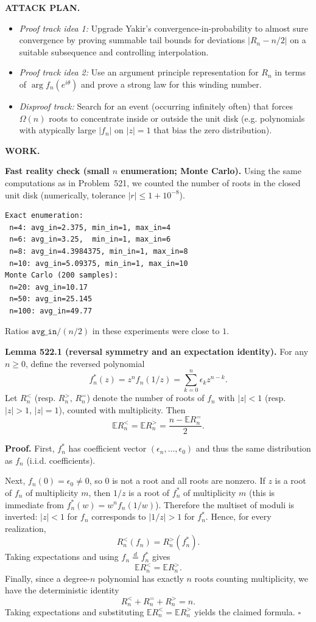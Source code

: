 \bigskip
\noindent\textbf{ATTACK PLAN.}
\begin{itemize}
\item \emph{Proof track idea 1:} Upgrade Yakir's convergence-in-probability to almost sure convergence by proving summable tail bounds for deviations $|R_n-n/2|$ on a suitable subsequence and controlling interpolation.
\item \emph{Proof track idea 2:} Use an argument principle representation for $R_n$ in terms of $\arg f_n(e^{i\theta})$ and prove a strong law for this winding number.
\item \emph{Disproof track:} Search for an event (occurring infinitely often) that forces $\Omega(n)$ roots to concentrate inside or outside the unit disk (e.g. polynomials with atypically large $|f_n|$ on $|z|=1$ that bias the zero distribution).
\end{itemize}

\bigskip
\noindent\textbf{WORK.}

\medskip
\noindent\textbf{Fast reality check (small $n$ enumeration; Monte Carlo).}
Using the same computations as in Problem~521, we counted the number of roots in the closed unit disk (numerically, tolerance $|r|\le 1+10^{-8}$).
\begin{verbatim}
Exact enumeration:
 n=4: avg_in=2.375, min_in=1, max_in=4
 n=6: avg_in=3.25,  min_in=1, max_in=6
 n=8: avg_in=4.3984375, min_in=1, max_in=8
 n=10: avg_in=5.09375, min_in=1, max_in=10
Monte Carlo (200 samples):
 n=20: avg_in=10.17
 n=50: avg_in=25.145
 n=100: avg_in=49.77
\end{verbatim}
Ratios $\texttt{avg\_in}/(n/2)$ in these experiments were close to $1$.

\medskip
\noindent\textbf{Lemma 522.1 (reversal symmetry and an expectation identity).}
For any $n\ge 0$, define the reversed polynomial
\[f_n^*(z)=z^n f_n(1/z)=\sum_{k=0}^n \epsilon_k z^{n-k}.
\]
Let $R_n^{<}$ (resp. $R_n^{>}$, $R_n^{=}$) denote the number of roots of $f_n$ with $|z|<1$ (resp. $|z|>1$, $|z|=1$), counted with multiplicity. Then
\[\mathbb E R_n^{<} = \mathbb E R_n^{>} = \frac{n-\mathbb E R_n^{=}}{2}.
\]

\noindent\textbf{Proof.}
First, $f_n^*$ has coefficient vector $(\epsilon_n,\dots,\epsilon_0)$ and thus the same distribution as $f_n$ (i.i.d. coefficients).

Next, $f_n(0)=\epsilon_0\ne 0$, so $0$ is not a root and all roots are nonzero.
If $z$ is a root of $f_n$ of multiplicity $m$, then $1/z$ is a root of $f_n^*$ of multiplicity $m$ (this is immediate from $f_n^*(w)=w^n f_n(1/w)$).
Therefore the multiset of moduli is inverted: $|z|<1$ for $f_n$ corresponds to $|1/z|>1$ for $f_n^*$. Hence, for every realization,
\[R_n^{<}(f_n)=R_n^{>}(f_n^*).
\]
Taking expectations and using $f_n\stackrel{d}{=} f_n^*$ gives
\[\mathbb E R_n^{<} = \mathbb E R_n^{>}.
\]
Finally, since a degree-$n$ polynomial has exactly $n$ roots counting multiplicity, we have the deterministic identity
\[R_n^{<}+R_n^{=}+R_n^{>}=n.
\]
Taking expectations and substituting $\mathbb E R_n^{<}=\mathbb E R_n^{>}$ yields the claimed formula.
\hfill$\square$

